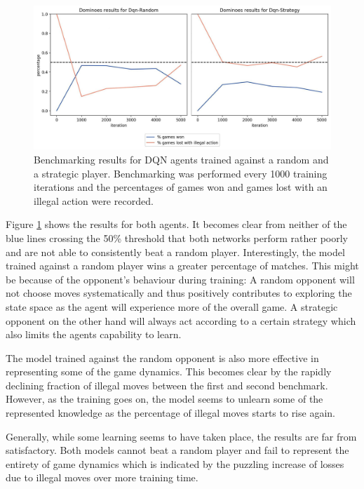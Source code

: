 \documentclass[12pt,a4paper]{article}
\begin{document}
{\begin{figure}
  \includegraphics[width=\linewidth]{img/dqn_both.jpg}
  \centering 
  \caption{Benchmarking results for DQN agents trained against a random and a strategic player. Benchmarking was performed every 1000 training iterations and the percentages of games won and games lost with an illegal action were recorded.}
  \label{fig:dqn_both}
\end{figure}

Figure \ref{fig:dqn_both} shows the results for both agents. It becomes clear from neither of the blue lines crossing the 50\% threshold that both networks perform rather poorly and are not able to consistently beat a random player.
Interestingly, the model trained against a random player wins a greater percentage of matches. This might be because of the opponent’s behaviour during training: A random opponent will not choose moves systematically and thus positively contributes to exploring the state space as the agent will experience more of the overall game. A strategic opponent on the other hand will always act according to a certain strategy which also limits the agents capability to learn.

The model trained against the random opponent is also more effective in representing some of the game dynamics. This becomes clear by the rapidly declining fraction of illegal moves between the first and second benchmark. However, as the training goes on, the model seems to unlearn some of the represented knowledge as the percentage of illegal moves starts to rise again.

Generally, while some learning seems to have taken place, the results are far from satisfactory. Both models cannot beat a random player and fail to represent the entirety of game dynamics which is indicated by the puzzling increase of losses due to illegal moves over more training time.

}
\end{document}
